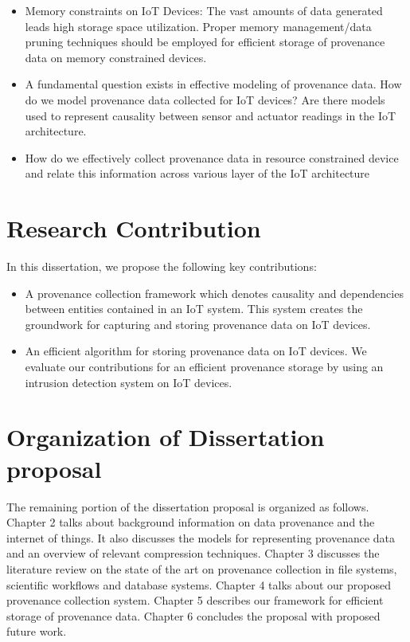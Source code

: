 \begin{itemize}

\item Memory constraints on IoT Devices: The vast amounts of data generated leads high storage space utilization. Proper memory management/data pruning techniques should be employed for efficient storage of provenance data on memory constrained devices. 

\item A fundamental question exists in effective modeling of provenance data. How do we model provenance data collected for IoT devices? Are there models used to represent causality between sensor and actuator readings in the IoT architecture.

\item How do we effectively collect provenance data in resource constrained device and relate this information across various layer of the IoT architecture

\end{itemize}

\section{Research Contribution}

In this dissertation, we propose the following key contributions:

\begin{itemize}
  \item A provenance collection framework which denotes causality and dependencies between entities contained in an IoT system. This system creates the groundwork for capturing and storing provenance data  on IoT devices.
  \item An efficient algorithm for storing provenance data on IoT devices. We evaluate our contributions for an efficient provenance storage by using an intrusion detection system on IoT devices.
\end{itemize}

\section{Organization of Dissertation proposal}

The remaining portion of the dissertation proposal is organized as follows. Chapter 2 talks about background information on data provenance and the internet of things. It also discusses the models for representing provenance data and an overview of relevant compression techniques. Chapter 3 discusses the literature review on the state of the art on provenance collection in file systems, scientific workflows and database systems. Chapter 4 talks about our proposed provenance collection system. Chapter 5 describes our framework for efficient storage of provenance data. Chapter 6 concludes the proposal with proposed future work.

